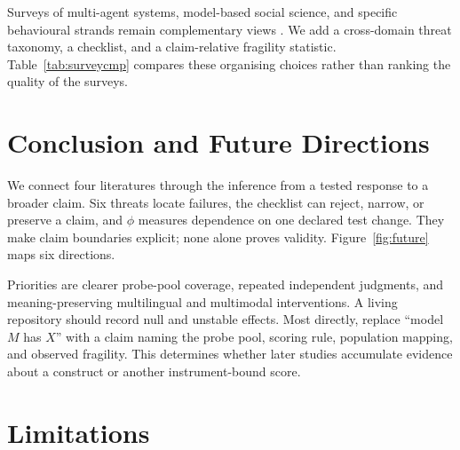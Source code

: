 \documentclass[11pt]{article}
\begin{document}
Surveys of multi-agent systems, model-based social science, and specific
behavioural strands remain complementary views
\cite{hao2026gametheoretic,jia2025socialscience,wallach2025position}. We add a
cross-domain threat taxonomy, a checklist, and a claim-relative fragility
statistic. Table~\ref{tab:surveycmp} compares these organising choices rather
than ranking the quality of the surveys.

\section{Conclusion and Future Directions}
\label{sec:conclusion}



We connect four literatures through the inference from a tested response to a
broader claim. Six threats locate failures, the checklist can reject, narrow, or
preserve a claim, and $\phi$ measures dependence on one declared test change.
They make claim boundaries explicit; none alone proves validity.
Figure~\ref{fig:future} maps six directions.

Priorities are clearer probe-pool coverage, repeated independent judgments, and
meaning-preserving multilingual and multimodal interventions. A living
repository should record null and unstable effects. Most directly, replace
``model $M$ has $X$'' with a claim naming the probe pool, scoring rule,
population mapping, and observed fragility. This determines whether later
studies accumulate evidence about a construct or another instrument-bound
score.

\clearpage
\section*{Limitations}
\end{document}
